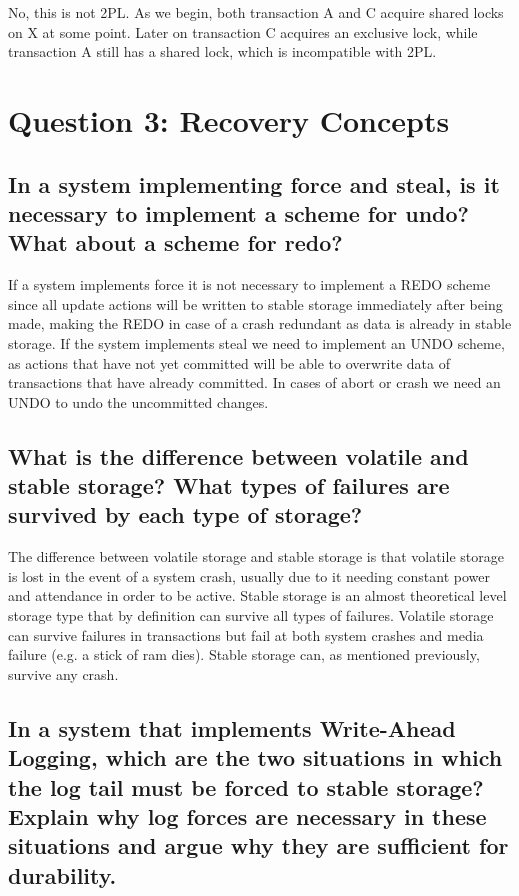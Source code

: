 \documentclass{article}
\begin{document}
No, this is not 2PL. As we begin, both transaction A and C acquire shared locks on X at some point. Later on transaction C acquires an exclusive lock, while transaction A still has a shared lock, which is incompatible with 2PL.


\section{Question 3: Recovery Concepts}
\subsection{In a system implementing force and steal, is it necessary to implement a scheme for undo? What about a scheme for redo?}

If a system implements force it is not necessary to implement a REDO scheme since all update actions will be written to stable storage immediately after being made, making the REDO in case of a crash redundant as data is already in stable storage. If the system implements steal we need to implement an UNDO scheme, as actions that have not yet committed will be able to overwrite data of transactions that have already committed. In cases of abort or crash we need an UNDO to undo the uncommitted changes.

\subsection{What is the difference between volatile and stable storage? What types of failures are survived by each type of storage?}

The difference between volatile storage and stable storage is that volatile storage is lost in the event of a system crash, usually due to it needing constant power and attendance in order to be active. Stable storage is an almost theoretical level storage type that by definition can survive all types of failures. Volatile storage can survive failures in transactions but fail at both system crashes and media failure (e.g. a stick of ram dies). Stable storage can, as mentioned previously, survive any crash.

\subsection{In a system that implements Write-Ahead Logging, which are the two situations in which the log tail must be forced to stable storage? Explain why log forces are necessary in these situations and argue why they are sufficient for durability.}
\end{document}
